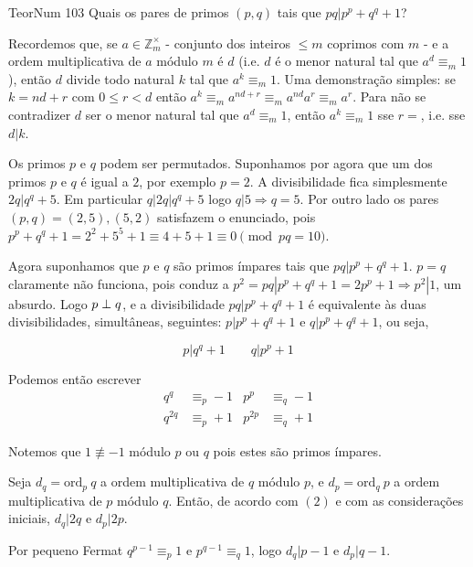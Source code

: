 \documentclass[main.tex]{subfiles}
\renewcommand*{\ord}[1]{\ensuremath{\text{ord}_#1\:}}
\begin{document}
\begin{problem}{TeorNum 103}
Quais os pares de primos $(p,q)$ tais que $pq|p^p+q^q+1$?
\end{problem}

\begin{solution}
\begin{note}
Recordemos que, se $a\in\mathbb{Z}_m^\times$ - conjunto dos inteiros $\leq m$ coprimos com $m$ - e a ordem multiplicativa de $a$ módulo $m$ é $d$ (i.e. $d$ é o menor natural tal que $a^d\equiv_m 1$), então $d$ divide todo natural $k$ tal que $a^k\equiv_m 1$.
Uma demonstração simples: se $k=nd+r$ com $0\leq r<d$ então
$a^k\equiv_m a^{nd+r}\equiv_ma^{nd}a^r\equiv_ma^r$. Para não se contradizer $d$ ser o menor natural tal que $a^d\equiv_m 1$, então $a^k\equiv_m 1$ sse $r=$, i.e. sse $d|k$.
\end{note}

Os primos $p$ e $q$ podem ser permutados. Suponhamos por agora que um dos primos $p$ e $q$ é igual a $2$, por exemplo $p=2$. A divisibilidade fica simplesmente $2q|q^q+5$. Em particular $q|2q|q^q+5$ logo $q|5\Rightarrow q=5$.
Por outro lado os pares $(p,q)=(2,5),(5,2)$ satisfazem o enunciado, pois
$p^p+q^q+1=2^2+5^5+1\equiv 4+5+1\equiv 0\pmod{pq=10}$.

Agora suponhamos que $p$ e $q$ são primos ímpares tais que $pq|p^p+q^q+1$.
$p=q$ claramente não funciona, pois conduz a $p^2=pq|p^p+q^q+1=2p^p+1\Rightarrow p^2|1$, um absurdo.
Logo $p\perp q$, e a divisibilidade $pq|p^p+q^q+1$ é equivalente às duas divisibilidades, simultâneas, seguintes:
$p|p^p+q^q+1$ e $q|p^p+q^q+1$, ou seja,

\begin{equation*}
p|q^q+1 \qquad q|p^p+1
\end{equation*}

Podemos então escrever
\begin{align}
q^q&\equiv_p -1 & p^p&\equiv_q -1\\
q^{2q}&\equiv_p +1 & p^{2p}&\equiv_q +1
\end{align}

Notemos que $1\not\equiv -1$ módulo $p$ ou $q$ pois estes são primos ímpares.

Seja $d_q=\ord{p} q$ a ordem multiplicativa de $q$ módulo $p$,
e $d_p=\ord{q} p$ a ordem multiplicativa de $p$ módulo $q$.
Então, de acordo com $(2)$ e com as considerações iniciais, $d_q|2q$ e $d_p|2p$.

Por pequeno Fermat $q^{p-1}\equiv_p 1$ e $p^{q-1}\equiv_q 1$,
logo $d_q|p-1$ e $d_p|q-1$.


\end{solution}
\end{document}
